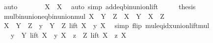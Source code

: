 \begin{isabellebody}
\ auto\isanewline
\ \ \isamarkupfalse%
\ \isamarkupfalse%
\ {\isachardoublequoteopen}{\isachardot}{\kern0pt}{\isachardot}{\kern0pt}{\isachardot}{\kern0pt}\ {\isacharequal}{\kern0pt}\ X\ {\isacharplus}{\kern0pt}\ X{\isachardoublequoteclose}\ \isamarkupfalse%
\ {\isacharparenleft}{\kern0pt}auto\ simp{\isacharcolon}{\kern0pt}\ add{\isacharunderscore}{\kern0pt}eq{\isacharunderscore}{\kern0pt}bin{\isacharunderscore}{\kern0pt}union{\isacharunderscore}{\kern0pt}lift{\isacharparenright}{\kern0pt}\isanewline
\ \ \isamarkupfalse%
\ \isamarkupfalse%
\ {\isacharquery}{\kern0pt}thesis\ \isacommand{{\isachardot}{\kern0pt}}\isamarkupfalse%
\isanewline
{}\isamarkupfalse%
%
\endisatagproof
{\isafoldproof}%
%
\isadelimproof
\isanewline
%
\endisadelimproof
\isanewline
{}\isamarkupfalse%
\ mul{\isacharunderscore}{\kern0pt}bin{\isacharunderscore}{\kern0pt}union{\isacharunderscore}{\kern0pt}eq{\isacharunderscore}{\kern0pt}bin{\isacharunderscore}{\kern0pt}union{\isacharunderscore}{\kern0pt}mul{\isacharcolon}{\kern0pt}\ {\isachardoublequoteopen}X\ {\isacharasterisk}{\kern0pt}\ {\isacharparenleft}{\kern0pt}Y\ {\isasymunion}\ Z{\isacharparenright}{\kern0pt}\ {\isacharequal}{\kern0pt}\ {\isacharparenleft}{\kern0pt}X\ {\isacharasterisk}{\kern0pt}\ Y{\isacharparenright}{\kern0pt}\ {\isasymunion}\ {\isacharparenleft}{\kern0pt}X\ {\isacharasterisk}{\kern0pt}\ Z{\isacharparenright}{\kern0pt}{\isachardoublequoteclose}\isanewline
%
\isadelimproof
%
\endisadelimproof
%
\isatagproof
{}\isamarkupfalse%
\ {\isacharminus}{\kern0pt}\isanewline
\ \ \isamarkupfalse%
\ {\isachardoublequoteopen}X\ {\isacharasterisk}{\kern0pt}\ {\isacharparenleft}{\kern0pt}Y\ {\isasymunion}\ Z{\isacharparenright}{\kern0pt}\ {\isacharequal}{\kern0pt}\ {\isacharparenleft}{\kern0pt}{\isasymUnion}y\ {\isasymin}\ {\isacharparenleft}{\kern0pt}Y\ {\isasymunion}\ Z{\isacharparenright}{\kern0pt}{\isachardot}{\kern0pt}\ lift\ {\isacharparenleft}{\kern0pt}X\ {\isacharasterisk}{\kern0pt}\ y{\isacharparenright}{\kern0pt}\ X{\isacharparenright}{\kern0pt}{\isachardoublequoteclose}\ \isamarkupfalse%
\ {\isacharparenleft}{\kern0pt}simp\ flip{\isacharcolon}{\kern0pt}\ mul{\isacharunderscore}{\kern0pt}eq{\isacharunderscore}{\kern0pt}idx{\isacharunderscore}{\kern0pt}union{\isacharunderscore}{\kern0pt}lift{\isacharunderscore}{\kern0pt}mul{\isacharparenright}{\kern0pt}\isanewline
\ \ \isamarkupfalse%
\ \isamarkupfalse%
\ {\isachardoublequoteopen}{\isachardot}{\kern0pt}{\isachardot}{\kern0pt}{\isachardot}{\kern0pt}\ {\isacharequal}{\kern0pt}\ {\isacharparenleft}{\kern0pt}{\isasymUnion}y\ {\isasymin}\ Y{\isachardot}{\kern0pt}\ lift\ {\isacharparenleft}{\kern0pt}X\ {\isacharasterisk}{\kern0pt}\ y{\isacharparenright}{\kern0pt}\ X{\isacharparenright}{\kern0pt}\ {\isasymunion}\ {\isacharparenleft}{\kern0pt}{\isasymUnion}z\ {\isasymin}\ Z{\isachardot}{\kern0pt}\ lift\ {\isacharparenleft}{\kern0pt}X\ {\isacharasterisk}{\kern0pt}\ z{\isacharparenright}{\kern0pt}\ X{\isacharparenright}{\kern0pt}{\isachardoublequoteclose}\isanewline

\end{isabellebody}
